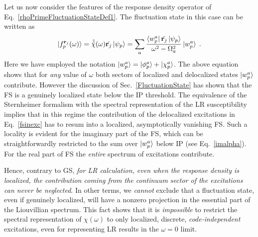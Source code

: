 \documentclass[reprint,aps,prb]{revtex4-1}
\newcommand{\dd}{{\rm d}}
\newcommand{\be}{\begin{equation}}
\newcommand{\ee}{\end{equation}}
\newcommand{\lb}{\label}
\newcommand{\op}[1]{\hat {#1}}
\newcommand{\sop}[1]{\op{\op {#1}}}
\newcommand{\trace}[1]{\mathrm{tr}\left(#1\right)}
\newcommand{\fscd}[1]{\mathrm{Im}\ket{f_p^{\mathbf r_j}(\omega)^{#1}}}
\begin{document}
Let us now consider the features of the response density operator of Eq.~\eqref{rhoPrimeFluctuationStateDef1}.
The fluctuation state in this case can be written as
\be\lb{fsinexc}
\ket{f_p^{\mathbf r_j}(\omega)}=
\sop \chi(\omega) \op{\mathbf r_j} \ket{\psi_p}
= \sum_a \frac{\bra{w_p^a} \op{\mathbf r_j} \ket{\psi_p}}{\omega^2 - \Omega_a^2}
\ket{w_p^a}\;.
\ee
Here we have employed the notation $\ket{w_p^a}=\ket{\phi_p^a}+\ket{\chi_p^a}$.
The above equation shows that for \emph{any} value of $\omega$ both sectors of localized and delocalized states $\ket{w_p^a}$ contribute.
However the discussion of Sec.~\ref{FluctuationState} has shown that
the FS is a genuinely localized state below the IP threshold.
The equivalence of the Sternheimer formalism with the spectral representation of the LR susceptibility implies that in this regime the contribution of the delocalized excitations in Eq.~\eqref{fsinexc} has to resum into a localized, asymptotically vanishing FS.
Such a locality is evident for the imaginary part of the FS, which
can be straightforwardly restricted to the sum over $\ket{w_p^a}$ below IP (see Eq.~\eqref{imalpha}). For the real part of FS the \emph{entire} spectrum
of excitations contribute.

Hence, contrary to GS, \emph{for LR calculation,
even when the response density is localized, the contribution coming from the
continuum sector of the excitations can never be neglected}.
In other terms, we \emph{cannot} exclude that a fluctuation state, even if genuinely localized, will have a nonzero projection
in the essential part of the Liouvillian spectrum.
This fact shows that it is \emph{impossible} to restrict the spectral representation
of $\chi(\omega)$ to only localized, discrete, \emph{code-independent} excitations, even for representing LR results in the $\omega=0$ limit.



%
%
%
%
\end{document}
